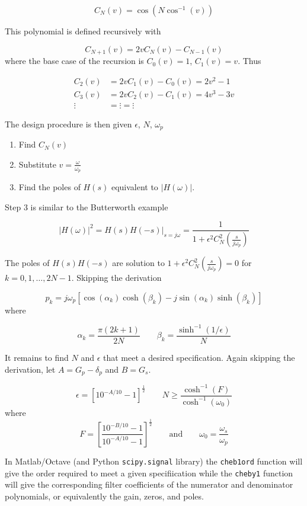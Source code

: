 \documentclass{article}
\begin{document}
\[
C_N(v) = \cos\left(N\cos^{-1}(v)\right)
\]

This polynomial is defined recursively with

\[
C_{N+1}(v) = 2vC_N(v) - C_{N-1}(v)
\]
where the base case of the recursion is $C_0(v) = 1$, $C_1(v) = v$. Thus

\begin{align*}
  C_2(v) &= 2v C_1(v) - C_0(v) = 2v^2 - 1\\
  C_3(v) &= 2v C_2(v) - C_1(v) = 4v^3 - 3v\\
  \vdots &= \vdots = \vdots
\end{align*}

The design procedure is then given $\epsilon$, $N$, $\omega_p$

\begin{enumerate}
\item Find $C_N(v)$
\item Substitute $v = \frac{\omega}{\omega_p}$
\item Find the poles of $H(s)$ equivalent to $|H(\omega)|$.
\end{enumerate}

Step 3 is similar to the Butterworth example

\[
\left| H(\omega) \right|^2 = \left. H(s)H(-s) \right|_{s=j\omega} = \frac{1}{1 + \epsilon^2C_N^2\left( \frac{s}{j\omega_p}\right)}
\]

The poles of $H(s)H(-s)$ are solution to $1 + \epsilon^2C_N^2\left( \frac{s}{j\omega_p}\right) = 0$ for $k = 0,1,\ldots, 2N-1$. Skipping the derivation

\[
p_k = j\omega_p \left[\cos(\alpha_k)\cosh(\beta_k) - j\sin(\alpha_k)\sinh(\beta_k) \right]
\]
where

\[
\alpha_k = \frac{\pi(2k+1)}{2N} \qquad \beta_k = \frac{\sinh^{-1}(1/\epsilon)}{N}
\]

It remains to find $N$ and $\epsilon$ that meet a desired specification. Again skipping the derivation, let $A = G_p - \delta_p$ and $B = G_s$.

\[
\epsilon = \left[10^{-A/10} - 1\right]^{\frac{1}{2}} \qquad N \geq \frac{\cosh^{-1}(F)}{\cosh^{-1}(\omega_0)}
\]
where
\[
F = \left[ \frac{10^{-B/10} - 1}{10^{-A/10} - 1} \right]^{\frac{1}{2}} \qquad\text{and}\qquad \omega_0 = \frac{\omega_s}{\omega_p}
\]

In Matlab/Octave (and Python \texttt{scipy.signal} library) the \texttt{cheb1ord} function will give the order required to meet a given specifiication while the \texttt{cheby1} function will give the corresponding filter coefficients of the numerator and denominator polynomials, or equivalently the gain, zeros, and poles.
\end{document}
